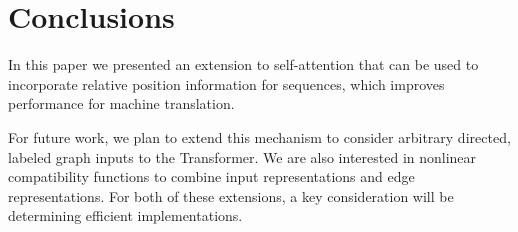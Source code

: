 \documentclass[11pt,a4paper]{article}
\begin{document}
\section{Conclusions}

In this paper we presented an extension to self-attention that can be used to incorporate relative position information for sequences, which improves performance for machine translation.

For future work, we plan to extend this mechanism to consider arbitrary directed, labeled graph inputs to the Transformer.
We are also interested in nonlinear compatibility functions to combine input representations and edge representations.
For both of these extensions, a key consideration will be determining efficient implementations.



\end{document}
